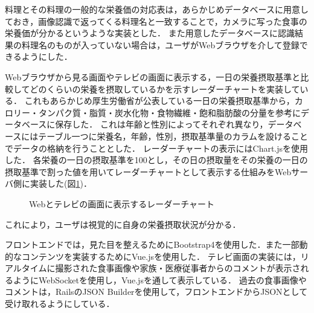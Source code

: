 \documentclass[../report]{subfiles}
\begin{document}
料理とその料理の一般的な栄養価の対応表は，あらかじめデータベースに用意しておき，画像認識で返ってくる料理名と一致することで，カメラに写った食事の栄養価が分かるというような実装とした．
また用意したデータベースに認識結果の料理名のものが入っていない場合は，ユーザがWebブラウザを介して登録できるようにした．

Webブラウザから見る画面やテレビの画面に表示する，一日の栄養摂取基準と比較してどのくらいの栄養を摂取しているかを示すレーダーチャートを実装している．
これもあらかじめ厚生労働省が公表している一日の栄養摂取基準から，カロリー・タンパク質・脂質・炭水化物・食物繊維・飽和脂肪酸の分量を参考にデータベースに保存した．
これは年齢と性別によってそれぞれ異なり，データベースにはテーブル一つに栄養名，年齢，性別，摂取基準量のカラムを設けることでデータの格納を行うこととした．
レーダーチャートの表示にはChart.jsを使用した．
各栄養の一日の摂取基準を100とし，その日の摂取量をその栄養の一日の摂取基準で割った値を用いてレーダーチャートとして表示する仕組みをWebサーバ側に実装した(図\ref{fig:6-radarchart})．

\begin{figure}[htbp]
    \begin{center}
        \caption{Webとテレビの画面に表示するレーダーチャート}
        \label{fig:6-radarchart}
    \end{center}
\end{figure}

これにより，ユーザは視覚的に自身の栄養摂取状況が分かる．

フロントエンドでは，見た目を整えるためにBootstrap4を使用した．また一部動的なコンテンツを実装するためにVue.jsを使用した．
テレビ画面の実装には，リアルタイムに撮影された食事画像や家族・医療従事者からのコメントが表示されるようにWebSocketを使用し，Vue.jsを通して表示している．
過去の食事画像やコメントは，RailsのJSON Builderを使用して，フロントエンドからJSONとして受け取れるようにしている．
\end{document}
